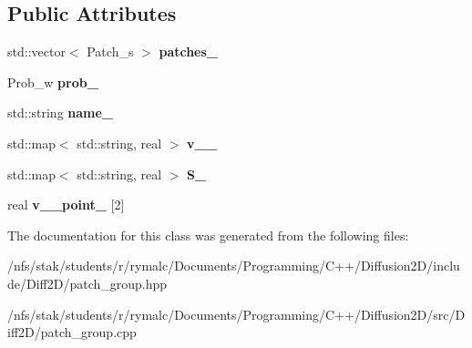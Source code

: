 \subsection*{Public Attributes}
\begin{DoxyCompactItemize}
\item 
\hypertarget{classPatch__Group_a637b27a0562076f78bf9b0698ac3609e}{
std::vector$<$ Patch\_\-s $>$ {\bfseries patches\_\-}}
\label{classPatch__Group_a637b27a0562076f78bf9b0698ac3609e}

\item 
\hypertarget{classPatch__Group_ac8d91a179d394f1d3d355d82ceb2dd2e}{
Prob\_\-w {\bfseries prob\_\-}}
\label{classPatch__Group_ac8d91a179d394f1d3d355d82ceb2dd2e}

\item 
\hypertarget{classPatch__Group_ac28afa5068ea65b91ce4d708f63c5a3a}{
std::string {\bfseries name\_\-}}
\label{classPatch__Group_ac28afa5068ea65b91ce4d708f63c5a3a}

\item 
\hypertarget{classPatch__Group_ae080e43ddd30ced473794b12a1cb3ccf}{
std::map$<$ std::string, real $>$ {\bfseries v\_\_\-}}
\label{classPatch__Group_ae080e43ddd30ced473794b12a1cb3ccf}

\item 
\hypertarget{classPatch__Group_aaad946bd88382b1e2e30cd1278632ace}{
std::map$<$ std::string, real $>$ {\bfseries S\_\-}}
\label{classPatch__Group_aaad946bd88382b1e2e30cd1278632ace}

\item 
\hypertarget{classPatch__Group_aec0690749d93e67521293acb28c81fb1}{
real {\bfseries v\_\_\-point\_\-} \mbox{[}2\mbox{]}}
\label{classPatch__Group_aec0690749d93e67521293acb28c81fb1}

\end{DoxyCompactItemize}


The documentation for this class was generated from the following files:\begin{DoxyCompactItemize}
\item 
/nfs/stak/students/r/rymalc/Documents/Programming/C++/Diffusion2D/include/Diff2D/patch\_\-group.hpp\item 
/nfs/stak/students/r/rymalc/Documents/Programming/C++/Diffusion2D/src/Diff2D/patch\_\-group.cpp\end{DoxyCompactItemize}
